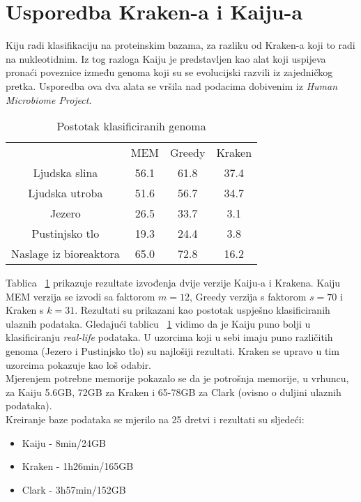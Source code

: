 \documentclass[times, utf8, seminar]{fer}
\begin{document}
\section{Usporedba Kraken-a i Kaiju-a}
Kiju radi klasifikaciju na proteinskim bazama, za razliku od Kraken-a koji to radi na nukleotidnim. Iz tog razloga Kaiju je predstavljen kao alat koji uspijeva pronaći poveznice između genoma koji su se evolucijski razvili iz zajedničkog pretka.
Usporedba ova dva alata se vršila nad podacima dobivenim iz \textit{Human Microbiome Project}.
\begin{table}[htbp]
	\centering
	\caption{Postotak klasificiranih genoma \cite{Kaiju}}
	\label{KK}
	\begin{tabular}{cccc}
		\multicolumn{1}{l}{}                       & \multicolumn{1}{l}{MEM} & Greedy & Kraken \\
		Ljudska slina                              & 56.1                    & 61.8   & 37.4   \\
		Ljudska utroba                             & 51.6                    & 56.7   & 34.7   \\
		Jezero                                     & 26.5                    & 33.7   & 3.1    \\
		Pustinjsko tlo                             & 19.3                    & 24.4   & 3.8    \\
		\multicolumn{1}{l}{Naslage iz bioreaktora} & 65.0                    & 72.8   & 16.2  
	\end{tabular}
\end{table}
Tablica ~\ref{KK} prikazuje rezultate izvođenja dvije verzije Kaiju-a i Krakena. Kaiju MEM verzija se izvodi sa faktorom $m=12$, Greedy verzija s faktorom $s=70$ i Kraken s $k=31$. Rezultati su prikazani kao postotak uspješno klasificiranih ulaznih podataka. Gledajući tablicu ~\ref{KK} vidimo da je Kaiju puno bolji u klasificiranju \textit{real-life} podataka. U uzorcima koji u sebi imaju puno različitih genoma (Jezero i Pustinjsko tlo) su najlošiji rezultati. Kraken se upravo u tim uzorcima pokazuje kao loš odabir.
\\Mjerenjem potrebne memorije pokazalo se da je potrošnja memorije, u vrhuncu, za Kaiju 5.6GB, 72GB za Kraken i 65-78GB za Clark (ovisno o duljini ulaznih podataka).
\\Kreiranje baze podataka se mjerilo na 25 dretvi i rezultati su sljedeći:
\begin{itemize}
	\item Kaiju - 8min/24GB
	\item Kraken - 1h26min/165GB
	\item Clark - 3h57min/152GB
\end{itemize}
\end{document}
